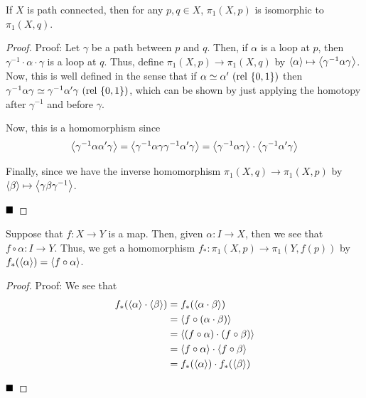 \begin{lemma}
    If $X$ is path connected, then for any $p, q \in X$, $\pi_1(X, p)$ is isomorphic to $\pi_1(X, q)$. 
\end{lemma}
\begin{proof}{Proof:}
    Let $\gamma$ be a path between $p$ and $q$. Then, if $\alpha$ is a loop at $p$, then $\gamma^{-1} \cdot \alpha \cdot \gamma$ is a loop at $q$. Thus, define $\pi_1(X, p) \to \pi_1(X, q)$ by $\brac{\alpha} \mapsto \brac{\gamma^{-1} \alpha \gamma}$. Now, this is well defined in the sense that if $\alpha \simeq \alpha'\ (\tt{rel }\{0, 1\})$ then $\gamma^{-1} \alpha \gamma \simeq \gamma^{-1} \alpha' \gamma\ (\tt{rel }\{0, 1\})$, which can be shown by just applying the homotopy after $\gamma^{-1}$ and before $\gamma$.\\


    Now, this is a homomorphism since 
    \[ \brac{\gamma^{-1} \alpha \alpha' \gamma} = \brac{\gamma^{-1} \alpha \gamma \gamma^{-1} \alpha' \gamma} = \brac{\gamma^{-1}\alpha \gamma} \cdot \brac{\gamma^{-1} \alpha' \gamma} \]

    Finally, since we have the inverse homomorphism $\pi_1(X, q) \to \pi_1(X, p)$ by $\brac{\beta} \mapsto \brac{\gamma \beta \gamma^{-1}}$. 

    $\qed$
\end{proof}



\begin{lemma}
    Suppose that $f : X \to Y$ is a map. Then, given $\alpha : I \to X$, then we see that $f \circ \alpha : I \to Y$. Thus, we get a homomorphism $f_{*} : \pi_1(X, p) \to \pi_1(Y, f(p))$ by $f_{*}(\brac{\alpha}) = \brac{f \circ \alpha}$. 
\end{lemma}
\begin{proof}{Proof:}
    We see that
    \begin{align*}
        f_{*}(\brac{\alpha} \cdot \brac{\beta}) &= f_{*}(\brac{\alpha \cdot \beta})\\
        &= \brac{f \circ (\alpha \cdot \beta)}\\
        &= \brac{(f \circ \alpha) \cdot (f \circ \beta)}\\
        &= \brac{f \circ \alpha} \cdot \brac{f \circ \beta}\\
        &= f_{*}(\brac{\alpha}) \cdot f_{*}(\brac{\beta})
    \end{align*}

    $\qed$
\end{proof}

